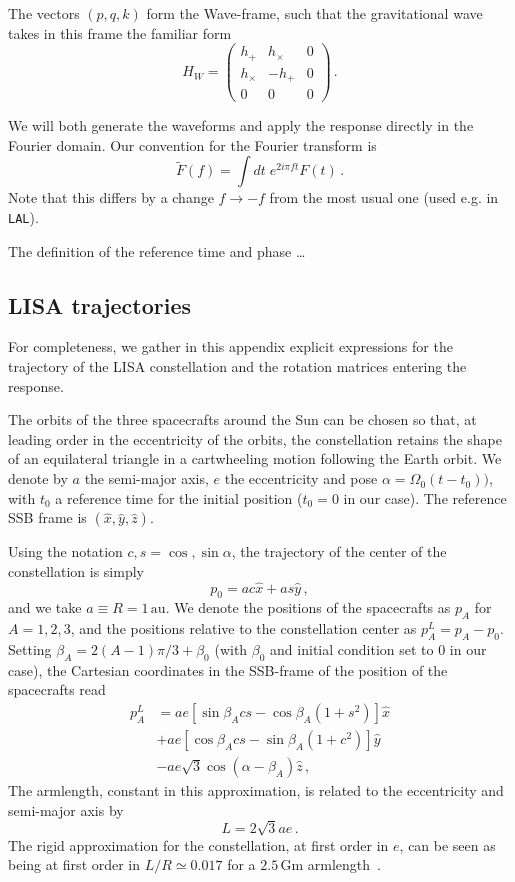 \documentclass[aps,showpacs,twocolumn,prd,superscriptaddress,nofootinbib]{revtex4-1}
\newcommand{\be}{\begin{equation}}
\newcommand{\ee}{\end{equation}}
\newcommand{\bsub}{\begin{subequations}}
\newcommand{\esub}{\end{subequations}}
\newcommand{\nn}{\nonumber}
\begin{document}
The vectors $(p,q,k)$ form the Wave-frame, such that the gravitational wave takes in this frame the familiar form
\be
	H_{W} = \begin{pmatrix}
		h_{+} & h_{\times} & 0 \\
		h_{\times} & -h_{+} & 0 \\
		0 & 0 & 0
		\end{pmatrix} \,.
\ee

We will both generate the waveforms and apply the response directly in the Fourier domain. Our convention for the Fourier transform is
\be\label{eq:defFourier}
	\tilde{F}(f) = \int dt \; e^{2 i \pi f t} F(t) \,.
\ee
Note that this differs by a change $f\rightarrow -f$ from the most usual one (used e.g. in \texttt{LAL}).

The definition of the reference time and phase \dots


\subsection{LISA trajectories}
\label{sec:lisatraj}

For completeness, we gather in this appendix explicit expressions for the trajectory of the LISA constellation and the rotation matrices entering the response.

The orbits of the three spacecrafts around the Sun can be chosen so that, at leading order in the eccentricity of the orbits, the constellation retains the shape of an equilateral triangle in a cartwheeling motion following the Earth orbit. We denote by $a$ the semi-major axis, $e$ the eccentricity and pose $\alpha = \Omega_{0} (t-t_{0}))$, with $t_{0}$ a reference time for the initial position ($t_{0} = 0$ in our case). The reference SSB frame is $(\hat{x}, \hat{y}, \hat{z})$.

Using the notation $c,s = \cos, \sin \alpha$, the trajectory of the center of the constellation is simply
\be
	p_{0} = ac \hat{x} + as \hat{y} \,,
\ee
and we take $a\equiv R = 1 \, \mathrm{au}$. We denote the positions of the spacecrafts as $p_{A}$ for $A=1,2,3$, and the positions relative to the constellation center as $p_{A}^{L} = p_{A} - p_{0}$. Setting $\beta_{A} = 2(A-1)\pi/3 + \beta_{0}$ (with $\beta_{0}$ and initial condition set to 0 in our case), the Cartesian coordinates in the SSB-frame of the position of the spacecrafts read~\cite{}
\bsub
\begin{align}
	p_{A}^{L} &= a e \left[ \sin \beta_{A} c s - \cos\beta_{A} \left( 1 + s^{2} \right) \right] \hat{x} \nn\\
	& + a e \left[ \cos \beta_{A} c s - \sin\beta_{A} \left( 1 + c^{2} \right) \right] \hat{y} \nn\\
	& - a e \sqrt{3} \cos(\alpha - \beta_{A}) \hat{z} \,,
\end{align}
\esub
The armlength, constant in this approximation, is related to the eccentricity and semi-major axis by
\be
	L = 2\sqrt{3} a e \,.
\ee
The rigid approximation for the constellation, at first order in $e$, can be seen as being at first order in $L/R \simeq 0.017$ for a $2.5 \, \mathrm{Gm}$ armlength~\cite{}.
\end{document}
